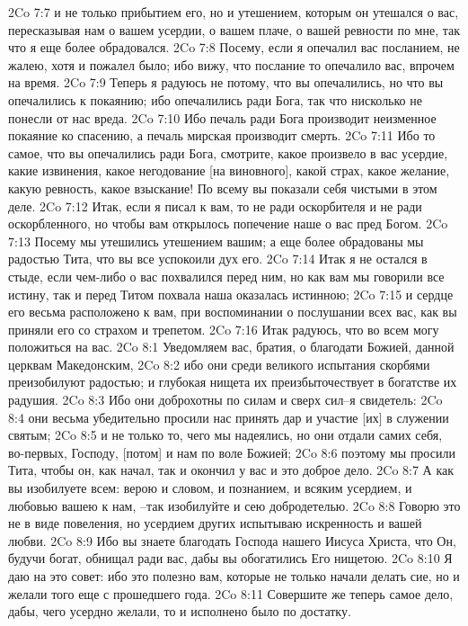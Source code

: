 2Co 7:7  и не только прибытием его, но и утешением, которым он утешался о вас, пересказывая нам о вашем усердии, о вашем плаче, о вашей ревности по мне, так что я еще более обрадовался.
2Co 7:8  Посему, если я опечалил вас посланием, не жалею, хотя и пожалел было; ибо вижу, что послание то опечалило вас, впрочем на время.
2Co 7:9  Теперь я радуюсь не потому, что вы опечалились, но что вы опечалились к покаянию; ибо опечалились ради Бога, так что нисколько не понесли от нас вреда.
2Co 7:10  Ибо печаль ради Бога производит неизменное покаяние ко спасению, а печаль мирская производит смерть.
2Co 7:11  Ибо то самое, что вы опечалились ради Бога, смотрите, какое произвело в вас усердие, какие извинения, какое негодование [на виновного], какой страх, какое желание, какую ревность, какое взыскание! По всему вы показали себя чистыми в этом деле.
2Co 7:12  Итак, если я писал к вам, то не ради оскорбителя и не ради оскорбленного, но чтобы вам открылось попечение наше о вас пред Богом.
2Co 7:13  Посему мы утешились утешением вашим; а еще более обрадованы мы радостью Тита, что вы все успокоили дух его.
2Co 7:14  Итак я не остался в стыде, если чем-либо о вас похвалился перед ним, но как вам мы говорили все истину, так и перед Титом похвала наша оказалась истинною;
2Co 7:15  и сердце его весьма расположено к вам, при воспоминании о послушании всех вас, как вы приняли его со страхом и трепетом.
2Co 7:16  Итак радуюсь, что во всем могу положиться на вас.
2Co 8:1  Уведомляем вас, братия, о благодати Божией, данной церквам Македонским,
2Co 8:2  ибо они среди великого испытания скорбями преизобилуют радостью; и глубокая нищета их преизбыточествует в богатстве их радушия.
2Co 8:3  Ибо они доброхотны по силам и сверх сил--я свидетель:
2Co 8:4  они весьма убедительно просили нас принять дар и участие [их] в служении святым;
2Co 8:5  и не только то, чего мы надеялись, но они отдали самих себя, во-первых, Господу, [потом] и нам по воле Божией;
2Co 8:6  поэтому мы просили Тита, чтобы он, как начал, так и окончил у вас и это доброе дело.
2Co 8:7  А как вы изобилуете всем: верою и словом, и познанием, и всяким усердием, и любовью вашею к нам, --так изобилуйте и сею добродетелью.
2Co 8:8  Говорю это не в виде повеления, но усердием других испытываю искренность и вашей любви.
2Co 8:9  Ибо вы знаете благодать Господа нашего Иисуса Христа, что Он, будучи богат, обнищал ради вас, дабы вы обогатились Его нищетою.
2Co 8:10  Я даю на это совет: ибо это полезно вам, которые не только начали делать сие, но и желали того еще с прошедшего года.
2Co 8:11  Совершите же теперь самое дело, дабы, чего усердно желали, то и исполнено было по достатку.
